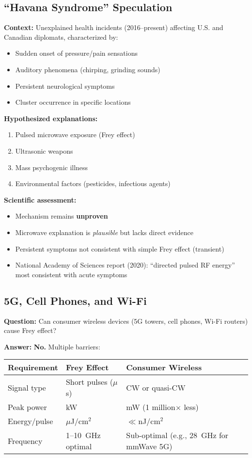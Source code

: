\subsection{``Havana Syndrome'' Speculation}

\textbf{Context:} Unexplained health incidents (2016--present) affecting U.S. and Canadian diplomats, characterized by:
\begin{itemize}
\item Sudden onset of pressure/pain sensations
\item Auditory phenomena (chirping, grinding sounds)
\item Persistent neurological symptoms
\item Cluster occurrence in specific locations
\end{itemize}

\textbf{Hypothesized explanations:}
\begin{enumerate}
\item Pulsed microwave exposure (Frey effect)
\item Ultrasonic weapons
\item Mass psychogenic illness
\item Environmental factors (pesticides, infectious agents)
\end{enumerate}

\textbf{Scientific assessment:}
\begin{itemize}
\item Mechanism remains \textbf{unproven}
\item Microwave explanation is \emph{plausible} but lacks direct evidence
\item Persistent symptoms not consistent with simple Frey effect (transient)
\item National Academy of Sciences report (2020): ``directed pulsed RF energy'' most consistent with acute symptoms
\end{itemize}

\subsection{5G, Cell Phones, and Wi-Fi}

\textbf{Question:} Can consumer wireless devices (5G towers, cell phones, Wi-Fi routers) cause Frey effect?

\textbf{Answer:} \textbf{No.} Multiple barriers:

\begin{center}
\begin{tabular}{@{}lll@{}}
\toprule
\textbf{Requirement} & \textbf{Frey Effect} & \textbf{Consumer Wireless} \\
\midrule
Signal type & Short pulses ($\mu$s) & CW or quasi-CW \\
Peak power & kW & mW (1 million$\times$ less) \\
Energy/pulse & $\mu$J/cm$^2$ & $\ll$nJ/cm$^2$ \\
Frequency & 1--10~GHz optimal & Sub-optimal (e.g., 28~GHz for mmWave 5G) \\
\bottomrule
\end{tabular}
\end{center}

